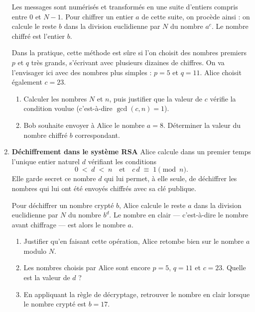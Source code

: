 \documentclass[a4paper,12pt]{article}
\begin{document}
\begin{multicols}{2}
\begin{exercice}[title=Exercice 28 $\star\star\star$ { [Modéliser, Calculer] }]{}{}
\begin{enumerate}
      Les messages sont numérisés et transformés en une suite d'entiers compris entre \(0\) et \(N-1\). Pour chiffrer un entier \(a\) de cette suite, on procède ainsi : on calcule le reste \(b\) dans la division euclidienne par \(N\) du nombre \(a^c\). Le nombre chiffré est l'entier \(b\).

      \medskip
      \noindent
      Dans la pratique, cette méthode est sûre si l'on choisit des nombres premiers \(p\) et \(q\) très grands, s'écrivant avec plusieurs dizaines de chiffres. On va l'envisager ici avec des nombres plus simples : \(p = 5\) et \(q = 11\). Alice choisit également \(c = 23\).

      \begin{enumerate}
        \item Calculer les nombres \(N\) et \(n\), puis justifier que la valeur de \(c\) vérifie la condition voulue (c'est-à-dire \(\gcd(c, n) = 1\)).
        \item Bob souhaite envoyer à Alice le nombre \(a = 8\). Déterminer la valeur du nombre chiffré \(b\) correspondant.
      \end{enumerate}
      \newcolumn

    \item \textbf{Déchiffrement dans le système RSA}
      Alice calcule dans un premier temps l'unique entier naturel \(d\) vérifiant les conditions
      \[
        0 \;<\; d \;<\; n
        \quad\text{et}\quad
        c\,d \;\equiv\; 1 \pmod{n}.
      \]
      Elle garde secret ce nombre \(d\) qui lui permet, à elle seule, de déchiffrer les nombres qui lui ont été envoyés chiffrés avec sa clé publique.

      Pour déchiffrer un nombre crypté \(b\), Alice calcule le reste \(a\) dans la division euclidienne par \(N\) du nombre \(b^d\). Le nombre en clair — c'est-à-dire le nombre avant chiffrage — est alors le nombre \(a\).

      \begin{enumerate}
        \item Justifier qu'en faisant cette opération, Alice retombe bien sur le nombre \(a\) modulo \(N\).
        \item Les nombres choisis par Alice sont encore \(p = 5\), \(q = 11\) et \(c = 23\).
          Quelle est la valeur de \(d\) ?
        \item En appliquant la règle de décryptage, retrouver le nombre en clair lorsque le nombre crypté est \(b = 17\).
      \end{enumerate}


\end{enumerate}
\end{exercice}
\end{multicols}
\end{document}
